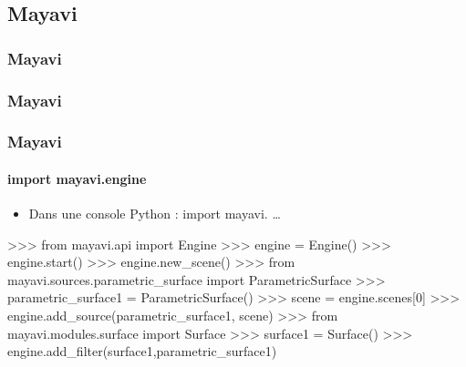 \subsection{Mayavi}
\begin{frame}
\frametitle{Mayavi}
\framesubtitle{}
{}
\end{frame}
\begin{frame}
\frametitle{Mayavi}
\framesubtitle{}
\end{frame}
\begin{frame}[fragile]
\frametitle{Mayavi}
\framesubtitle{import mayavi.engine}
\begin{itemize}
 \item Dans une console Python : import mayavi. \dots
\end{itemize}
\begin{pythonConsole}
>>> from mayavi.api import Engine
>>> engine = Engine()
>>> engine.start()
>>> engine.new_scene()
>>> from mayavi.sources.parametric_surface import ParametricSurface
>>> parametric_surface1 = ParametricSurface()
>>> scene = engine.scenes[0]
>>> engine.add_source(parametric_surface1, scene)
>>> from mayavi.modules.surface import Surface
>>> surface1 = Surface()
>>> engine.add_filter(surface1,parametric_surface1)
\end{pythonConsole}
\end{frame}
